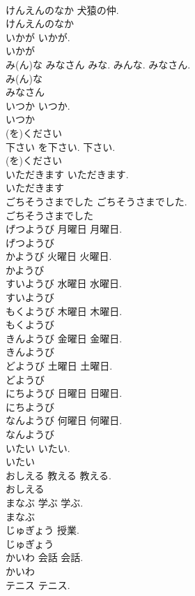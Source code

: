 \documentclass[8pt]{extreport}
\begin{document}
\begin{CJK}{UTF8}{min}
\\	けんえんのなか		犬猿の仲.	
\\	けんえんのなか
\\	いかが		いかが.	
\\	いかが
\\	み(ん)な みなさん		みな. みんな. みなさん.	
\\	み(ん)な
\\	みなさん
\\	いつか		いつか.	
\\	いつか
\\	(を)ください	
\\	下さい	を下さい. 下さい.	
\\	(を)ください
\\	いただきます		いただきます.	
\\	いただきます
\\	ごちそうさまでした		ごちそうさまでした.	
\\	ごちそうさまでした
\\	げつようび	月曜日	月曜日.	
\\	げつようび
\\	かようび	火曜日	火曜日.	
\\	かようび
\\	すいようび	水曜日	水曜日.	
\\	すいようび
\\	もくようび	木曜日	木曜日.	
\\	もくようび
\\	きんようび	金曜日	金曜日.	
\\	きんようび
\\	どようび	土曜日	土曜日.	
\\	どようび
\\	にちようび	日曜日	日曜日.	
\\	にちようび
\\	なんようび	何曜日	何曜日.	
\\	なんようび
\\	いたい		いたい.	
\\	いたい
\\	おしえる	教える	教える.	
\\	おしえる
\\	まなぶ	学ぶ	学ぶ.	
\\	まなぶ
\\	じゅぎょう		授業.	
\\	じゅぎょう
\\	かいわ	会話	会話.	
\\	かいわ
\\	テニス		テニス.	

\end{CJK}
\end{document}

